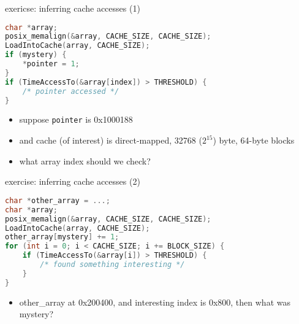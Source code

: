 \begin{frame}[fragile]{exericse: inferring cache accesses (1)}
\begin{lstlisting}[language=C,style=smaller]
char *array;
posix_memalign(&array, CACHE_SIZE, CACHE_SIZE);
LoadIntoCache(array, CACHE_SIZE);
if (mystery) {
    *pointer = 1;
}
if (TimeAccessTo(&array[index]) > THRESHOLD) {
    /* pointer accessed */
}
\end{lstlisting}
\begin{itemize}
\item suppose \texttt{pointer} is 0x1000188
\item and cache (of interest) is direct-mapped, 32768 ($2^{15}$) byte, 64-byte blocks
\item what array index should we check?
\end{itemize}
\end{frame}

\begin{frame}[fragile]{exercise: inferring cache accesses (2)}
\begin{lstlisting}[language=C,style=smaller]
char *other_array = ...;
char *array;
posix_memalign(&array, CACHE_SIZE, CACHE_SIZE);
LoadIntoCache(array, CACHE_SIZE);
other_array[mystery] += 1;
for (int i = 0; i < CACHE_SIZE; i += BLOCK_SIZE) {
    if (TimeAccessTo(&array[i]) > THRESHOLD) {
        /* found something interesting */
    }
}
\end{lstlisting}
\begin{itemize}
\item other\_array at 0x200400, and interesting index is 0x800,
    then what was mystery?
\end{itemize}
\end{frame}

